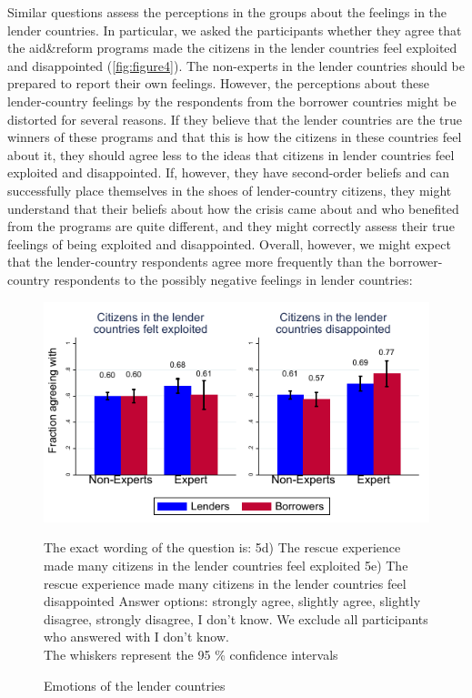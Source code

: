 Similar questions assess the perceptions in the groups about the
feelings in the lender countries. In particular, we asked the participants whether they
agree that the aid\&reform programs made the citizens in the
lender countries feel exploited and disappointed (\autoref{fig:figure4}). The non-experts in the lender
countries should be prepared to report their own feelings. However, the
perceptions about these lender-country feelings by the respondents from the
borrower countries might be distorted for several reasons. If they believe
that the lender countries are the true winners of these programs and that
this is how the citizens in these countries feel about it, they should agree
less to the ideas that citizens in lender countries feel exploited and
disappointed. If, however, they have second-order beliefs and can
successfully place themselves in the shoes of lender-country citizens, they
might understand that their beliefs about how the crisis came about and who
benefited from the programs are quite different, and they might correctly
assess their true feelings of being exploited and disappointed. Overall,
however, we might expect that the lender-country respondents agree more
frequently than the borrower-country respondents to the possibly negative
feelings in lender countries:

\begin{figure}[h!]
  \begin{center}
       \caption{Emotions of the lender countries}
    \includegraphics[scale=1.2]{graph5_2.pdf}
 
    \label{fig:figure4}
    \end{center}
    \tiny
    \begin{tablenotes}
     {The exact wording of the question is: 5d) The rescue experience made many citizens in the lender countries feel exploited 5e) The rescue experience made many citizens in the lender countries feel disappointed
    Answer options: strongly agree, slightly agree, slightly disagree, strongly disagree, I don't know. We exclude all participants who answered with I don't know. \\
    The whiskers represent the 95 \% confidence intervals}
    \end{tablenotes}
\end{figure}

